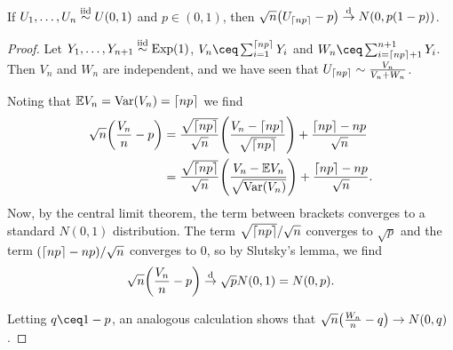 \begin{lemma}
    If $U_1, \dotsc, U_n \overset{\mathrm{iid}}{\sim} U(0, 1)$ and $p \in (0, 1)$, then $\sqrt n \qty(U_{\lceil np\rceil} - p) \overset{\mathrm{d}}{\to} N(0, p(1-p))$. 
\end{lemma}

\begin{proof}
    Let $Y_1, \dotsc, Y_{n+1} \overset{\mathrm{iid}}{\sim} \operatorname{Exp}(1)$, $V_n \ceq \sum_{i=1}^{\ceil{np}} Y_i$ and $W_n \ceq \sum_{i = \ceil{np} + 1}^{n+1} Y_i$. Then $V_n$ and $W_n$ are independent, and we have seen that $U_{\lceil np\rceil} \sim \frac{V_n}{V_n + W_n}$. 
    
    Noting that $\mathbb E V_n = \operatorname{Var}(V_n) = \lceil np\rceil$ we find
    \begin{align*}
    \sqrt{n} \qty(\frac{V_n}{n} - p) &= \frac{\sqrt{\lceil np\rceil}}{\sqrt n} \qty(\frac{V_n - \lceil np\rceil}{\sqrt{\lceil np\rceil}}) + \frac{\lceil np\rceil - np}{\sqrt n} \\
    &= \frac{\sqrt{\lceil np\rceil}}{\sqrt n}  \qty(\frac{V_n - \mathbb E V_n}{\sqrt{\operatorname{Var}(V_n)}}) +  \frac{\lceil np\rceil - np}{\sqrt n}.
    \end{align*}
    Now, by the central limit theorem, the term between brackets converges to a standard $N(0, 1)$ distribution. The term $\sqrt{\lceil np\rceil}/{\sqrt n}$ converges to $\sqrt p$ and the term $(\lceil np\rceil - np)/\sqrt n$ converges to 0, so by Slutsky's lemma, we find
    \[
    \sqrt{n}\qty(\frac{V_n}{n} - p) \overset{\mathrm{d}}{\to} \sqrt p N(0, 1) = N(0, p). 
    \]
    
    Letting $q \ceq 1 - p$, 
    an analogous calculation shows that $\sqrt n \qty(\frac{W_n}{n} - q) \to N(0, q)$. 
    

\end{proof}
